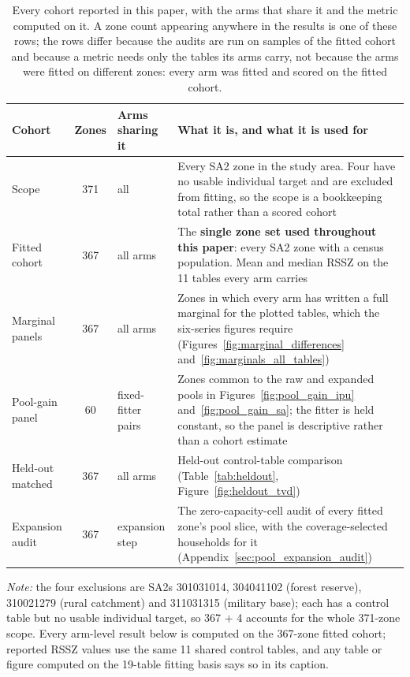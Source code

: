 \documentclass[review]{elsarticle}
\begin{document}
\begin{table}[h!]
\centering
\caption{Every cohort reported in this paper, with the arms that share it and the
metric computed on it. A zone count appearing anywhere in the results is one of
these rows; the rows differ because the audits are run on samples of the fitted
cohort and because a metric needs only the tables its arms carry, not because the
arms were fitted on different zones: every arm was fitted and scored on the fitted cohort.}
\label{tab:cohorts}
\footnotesize
\setlength{\tabcolsep}{5pt}
\begin{tabular}{@{}lclp{7.0cm}@{}}
\toprule
\textbf{Cohort} & \textbf{Zones} & \textbf{Arms sharing it} & \textbf{What it is, and what it is used for} \\
\midrule
Scope            & 371 & all & Every SA2 zone in the study area. Four have no usable individual target and are excluded from fitting, so the scope is a bookkeeping total rather than a scored cohort \\
Fitted cohort    & 367 & all arms & The \textbf{single zone set used throughout this paper}: every SA2 zone with a census population. Mean and median RSSZ on the 11 tables every arm carries \\
Marginal panels  & 367 & all arms & Zones in which every arm has written a full marginal for the plotted tables, which the six-series figures require (Figures~\ref{fig:marginal_differences} and~\ref{fig:marginals_all_tables}) \\
Pool-gain panel  & 60  & fixed-fitter pairs & Zones common to the raw and expanded pools in Figures~\ref{fig:pool_gain_ipu} and~\ref{fig:pool_gain_sa}; the fitter is held constant, so the panel is descriptive rather than a cohort estimate \\
Held-out matched & 367 & all arms & Held-out control-table comparison (Table~\ref{tab:heldout}, Figure~\ref{fig:heldout_tvd}) \\
Expansion audit  & 367 & expansion step & The zero-capacity-cell audit of every fitted zone's pool slice, with the coverage-selected households for it (Appendix~\ref{sec:pool_expansion_audit}) \\
\bottomrule
\end{tabular}
\end{table}

{\footnotesize\textit{Note:} the four exclusions are SA2s 301031014, 304041102 (forest reserve), 310021279 (rural catchment) and 311031315 (military base); each has a control table but no usable individual target, so 367 $+$ 4 accounts for the whole 371-zone scope. Every arm-level result below is computed on the 367-zone fitted cohort; reported RSSZ values use the same 11 shared control tables, and any table or figure computed on the 19-table fitting basis says so in its caption.}
\end{document}
